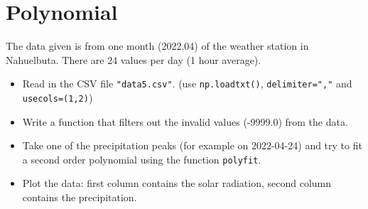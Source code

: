 \section{Polynomial}

The data given is from one month (2022.04) of the weather station in Nahuelbuta.
There are 24 values per day (1 hour average).

\begin{itemize}
    \item Read in the CSV file \verb|"data5.csv"|. (use \verb|np.loadtxt()|, \verb|delimiter=","| and \verb|usecols=(1,2)|)
    \item Write a function that filters out the invalid values (-9999.0) from the data.
    \item Take one of the precipitation peaks (for example on 2022-04-24) and try to fit a second order polynomial using the function \verb|polyfit|.
    \item Plot the data: first column contains the solar radiation, second column contains the precipitation.
\end{itemize}

